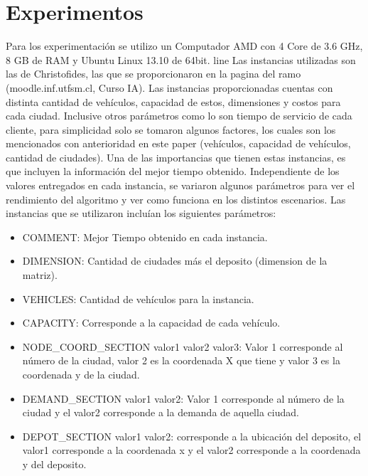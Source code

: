 \documentclass[letter, 10pt]{article}
\begin{document}
\newpage
\section{Experimentos}
Para los experimentaci\'on se utilizo un Computador AMD con 4 Core de 3.6 GHz, 8 GB de RAM y Ubuntu Linux 13.10 de 64bit.
\new line
Las instancias utilizadas son las de Christofides, las que se proporcionaron en la pagina del ramo (moodle.inf.utfsm.cl, Curso IA). Las instancias proporcionadas cuentas con distinta cantidad de veh\'iculos, capacidad de estos, dimensiones y costos para cada ciudad. Inclusive otros par\'ametros como lo son tiempo de servicio de cada cliente, para simplicidad solo se tomaron algunos factores, los cuales son los mencionados con anterioridad en este paper (veh\'iculos, capacidad de veh\'iculos, cantidad de ciudades). Una de las importancias que tienen estas instancias, es que incluyen la informaci\'on del mejor tiempo obtenido.
\newline
Independiente de los valores entregados en cada instancia, se variaron algunos par\'ametros para ver el rendimiento del algoritmo y ver como funciona en los distintos escenarios.
\newline
	Las instancias que se utilizaron inclu\'ian los siguientes par\'ametros:
	\begin{itemize}
		\item COMMENT: Mejor Tiempo obtenido en cada instancia.
		\item DIMENSION: Cantidad de ciudades m\'as el deposito (dimension de la matriz).
		\item VEHICLES: Cantidad de veh\'iculos para la instancia.
		\item CAPACITY: Corresponde a la capacidad de cada veh\'iculo.		
		\item NODE\_COORD\_SECTION valor1 valor2 valor3: Valor 1 corresponde al n\'umero de la ciudad, valor 2 es la coordenada X que tiene y valor 3 es la coordenada y de la ciudad.
		\item DEMAND\_SECTION valor1 valor2: Valor 1 corresponde al n\'umero de la ciudad y el valor2 corresponde a la demanda de aquella ciudad.
		\item DEPOT\_SECTION valor1 valor2: corresponde a la ubicaci\'on del deposito, el valor1 corresponde a la coordenada x y el valor2 corresponde a la coordenada y del deposito.
	\end{itemize}
	
\end{document}
